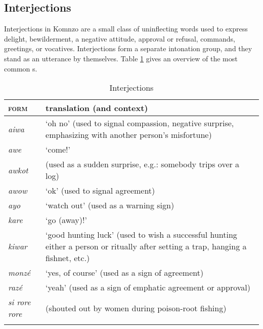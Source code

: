 \subsection{Interjections} \label{interjectionsec}
\vspace{-0.2cm}
Interjections in Komnzo are a small class of uninflecting words used to express delight, bewilderment, a negative attitude, approval or refusal, commands, greetings, or vocatives. Interjections form a separate intonation group, and they stand as an utterance by themselves. Table \ref{interjections} gives an overview of the most common s.
\vspace{-0.2cm}
\begin{table}
\caption{Interjections}
\label{interjections}
	\begin{tabularx}{\textwidth}{Xp{}}
		\lsptoprule
		\textsc{form}&{translation (and context)}\\\midrule
		\emph{aiwa}&`oh no' (used to signal compassion, negative surprise, emphasizing with another person's misfortune)\\
		\emph{awe}&`come!'\\
		\emph{awkot}& (used as a sudden surprise, e.g.: somebody trips over a log)\\
		\emph{awow}&`ok' (used to signal agreement)\\
		\emph{ayo}&`watch out' (used as a warning sign)\\
		\emph{kare}&`go (away)!'\\
		\emph{kiwar}&`good hunting luck' (used to wish a successful hunting either a person or ritually after setting a trap, hanging a fishnet, etc.)\\
		\emph{monzé}&`yes, of course' (used as a sign of agreement)\\
		\emph{razé}&`yeah' (used as a sign of emphatic agreement or approval)\\
		\emph{si rore rore}& (shouted out by women during poison-root fishing)\\
		\lspbottomrule
	\end{tabularx}
\end{table}%